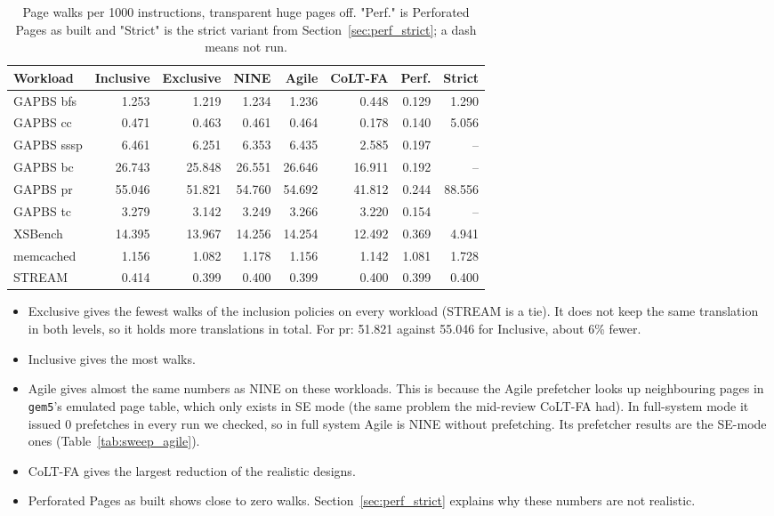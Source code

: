 \begin{table}[H]
\centering
\small
\caption{Page walks per 1000 instructions, transparent huge pages off. "Perf." is Perforated Pages as built and "Strict" is the strict variant from Section~\ref{sec:perf_strict}; a dash means not run.}
\label{tab:thpoff_all}
\begin{tabular}{l r r r r r r r}
\toprule
\textbf{Workload} & \textbf{Inclusive} & \textbf{Exclusive} & \textbf{NINE} & \textbf{Agile} & \textbf{CoLT-FA} & \textbf{Perf.} & \textbf{Strict} \\
\midrule
GAPBS bfs & 1.253 & 1.219 & 1.234 & 1.236 & 0.448 & 0.129 & 1.290 \\
GAPBS cc & 0.471 & 0.463 & 0.461 & 0.464 & 0.178 & 0.140 & 5.056 \\
GAPBS sssp & 6.461 & 6.251 & 6.353 & 6.435 & 2.585 & 0.197 & -- \\
GAPBS bc & 26.743 & 25.848 & 26.551 & 26.646 & 16.911 & 0.192 & -- \\
GAPBS pr & 55.046 & 51.821 & 54.760 & 54.692 & 41.812 & 0.244 & 88.556 \\
GAPBS tc & 3.279 & 3.142 & 3.249 & 3.266 & 3.220 & 0.154 & -- \\
XSBench & 14.395 & 13.967 & 14.256 & 14.254 & 12.492 & 0.369 & 4.941 \\
memcached & 1.156 & 1.082 & 1.178 & 1.156 & 1.142 & 1.081 & 1.728 \\
STREAM & 0.414 & 0.399 & 0.400 & 0.399 & 0.400 & 0.399 & 0.400 \\
\bottomrule
\end{tabular}
\end{table}

\begin{itemize}
    \item Exclusive gives the fewest walks of the inclusion policies on every workload (STREAM is a tie). It does not keep the same translation in both levels, so it holds more translations in total. For pr: 51.821 against 55.046 for Inclusive, about 6\% fewer.
    \item Inclusive gives the most walks.
    \item Agile gives almost the same numbers as NINE on these workloads. This is because the Agile prefetcher looks up neighbouring pages in \texttt{gem5}'s emulated page table, which only exists in SE mode (the same problem the mid-review CoLT-FA had). In full-system mode it issued 0 prefetches in every run we checked, so in full system Agile is NINE without prefetching. Its prefetcher results are the SE-mode ones (Table~\ref{tab:sweep_agile}).
    \item CoLT-FA gives the largest reduction of the realistic designs.
    \item Perforated Pages as built shows close to zero walks. Section~\ref{sec:perf_strict} explains why these numbers are not realistic.
\end{itemize}

